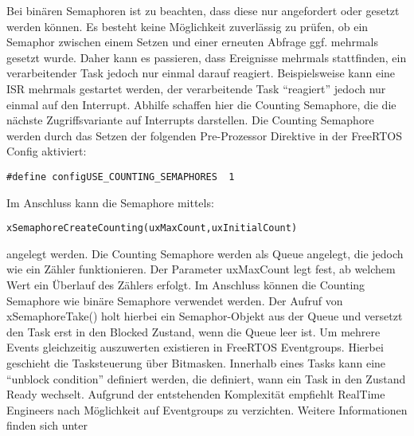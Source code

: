 Bei binären Semaphoren ist zu beachten, dass diese nur angefordert oder gesetzt werden können. Es besteht keine Mög\-lich\-keit zuverlässig zu prüfen, ob ein Semaphor zwischen einem Setzen und einer erneuten Abfrage ggf. mehrmals gesetzt wurde. Daher kann es passieren, dass Ereignisse mehrmals stattfinden, ein verarbeitender Task jedoch nur einmal darauf reagiert. Beispielsweise kann eine ISR mehrmals gestartet werden, der verarbeitende Task "`reagiert"' jedoch nur einmal auf den Interrupt.
Abhilfe schaffen hier die Counting Semaphore, die die nächste Zugriffsvariante auf Interrupts darstellen. Die Counting Semaphore werden durch das Setzen der folgenden Pre-Prozessor Direktive in der FreeRTOS Config aktiviert:
\begin{lstlisting}[numbers = none]
#define configUSE_COUNTING_SEMAPHORES  1
\end{lstlisting}
Im Anschluss kann die Semaphore mittels:
\begin{lstlisting}[numbers = none]
xSemaphoreCreateCounting(uxMaxCount,uxInitialCount) 
\end{lstlisting}
angelegt werden. Die Counting Semaphore werden als Que\-ue angelegt, die jedoch wie ein Zähler funktionieren. Der Parameter uxMaxCount legt fest, ab welchem Wert ein Überlauf des Zählers erfolgt. 
Im Anschluss kön\-nen die Counting Semaphore wie binäre Semaphore verwendet werden. Der Aufruf von xSemaphoreTake() holt hierbei ein Semaphor-Objekt aus der Queue und versetzt den Task erst in den Blocked Zustand, wenn die Queue leer ist\cite[p.191ff]{MasteringFreeRtos}.
Um mehrere Events gleichzeitig auszuwerten existieren in FreeRTOS Eventgroups. Hierbei geschieht die Tasksteuerung über Bitmasken. Innerhalb eines Tasks kann eine "`unblock condition"' definiert werden, die definiert, wann ein Task in den Zustand Ready wechselt. Aufgrund der entstehenden Komplexität empfiehlt RealTime Engineers nach Mög\-lich\-keit auf Eventgroups zu verzichten. Weitere Informationen finden sich unter \cite[p.265ff]{MasteringFreeRtos} 
